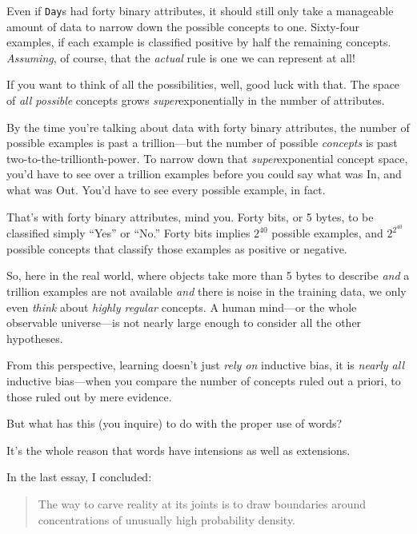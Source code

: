 {{{
 Even if \texttt{Day}s had forty binary attributes, it should still only
take a manageable amount of data to narrow down the possible concepts
to one. Sixty-four examples, if each example is classified positive by
half the remaining concepts. \textit{Assuming}, of course, that the
\textit{actual} rule is one we can represent at all!}

{
 If you want to think of all the possibilities, well, good luck
with that. The space of \textit{all possible} concepts grows
\textit{super}exponentially in the number of attributes.}

{
 By the time you're talking about data with forty
binary attributes, the number of possible examples is past a
trillion---but the number of possible \textit{concepts} is past
two-to-the-trillionth-power. To narrow down that
\textit{super}exponential concept space, you'd have to
see over a trillion examples before you could say what was In, and what
was Out. You'd have to see every possible example, in
fact.}

{
 That's with forty binary attributes, mind you.
Forty bits, or 5 bytes, to be classified simply
``Yes'' or
``No.'' Forty bits implies
$2^{40}$ possible examples, and $2^{2^{40}}$
possible concepts that classify those examples as positive or
negative.}

{
 So, here in the real world, where objects take more than 5 bytes
to describe \textit{and} a trillion examples are not available
\textit{and} there is noise in the training data, we only even
\textit{think} about \textit{highly regular} concepts. A human
mind---or the whole observable universe---is not nearly large enough to
consider all the other hypotheses.}

{
 From this perspective, learning doesn't just
\textit{rely on} inductive bias, it is \textit{nearly all} inductive
bias---when you compare the number of concepts ruled out a priori, to
those ruled out by mere evidence.}

{
 But what has this (you inquire) to do with the proper use of
words?}

{
 It's the whole reason that words have intensions
as well as extensions.}

{
 In the last essay, I concluded:}

\begin{quote}
 The way to carve reality at its joints is to draw boundaries
 around concentrations of unusually high probability density.
\end{quote}

}}
